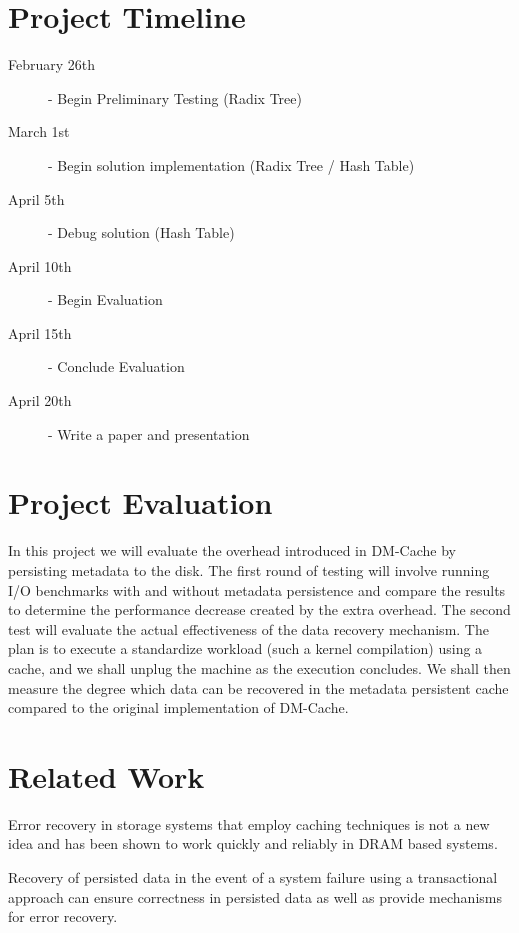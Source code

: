 \documentclass[letterpaper,12pt]{article}
\begin{document}

\pagebreak
\section*{Project Timeline}

\begin{description}
  \item[February 26th] - Begin Preliminary Testing (Radix Tree)
  \item[March 1st] - Begin solution implementation (Radix Tree / Hash
  Table)
  \item[April 5th] - Debug solution (Hash Table)
  \item[April 10th] - Begin Evaluation
  \item[April 15th] - Conclude Evaluation
  \item[April 20th] - Write a paper and presentation
\end{description}


\section*{Project Evaluation}

In this project we will evaluate the overhead introduced in DM-Cache
by persisting metadata to the disk. The first round of testing will
involve running I/O benchmarks with and without metadata persistence
and compare the results to determine the performance decrease created
by the extra overhead. The second test will evaluate the actual
effectiveness of the data recovery mechanism. The plan is to execute a
standardize workload (such a kernel compilation) using a cache, and we
shall unplug the machine as the execution concludes. We shall then
measure the degree which data can be recovered in the metadata
persistent cache compared to the original implementation of DM-Cache.


\section*{Related Work}

Error recovery in storage systems that employ caching techniques is
not a new idea and has been shown to work quickly and reliably in DRAM
based systems\cite{RAMCloud}.

Recovery of persisted data in the event of a system failure using a
transactional approach can ensure correctness in persisted data as
well as provide mechanisms for error recovery\cite{NVHeaps}.
\end{document}
